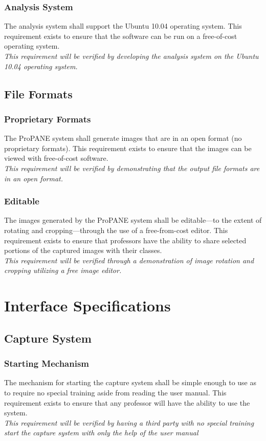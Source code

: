 \documentclass[]{article}
\begin{document}
			\subsubsection{Analysis System}
				The analysis system shall support the Ubuntu 10.04 operating system. This requirement exists to ensure that the software can be run on a free-of-cost operating system. \\
				\emph{This requirement will be verified by developing the analysis system on the Ubuntu 10.04 operating system.}
				
		
		\subsection{File Formats}
			
			\subsubsection{Proprietary Formats}
				The ProPANE system shall generate images that are in an open format (no proprietary formats). This requirement exists to ensure that the images can be viewed with free-of-cost software. \\
				\emph{This requirement will be verified by demonstrating that the output file formats are in an open format.}
				
			\subsubsection{Editable}
				The images generated by the ProPANE system shall be editable---to the extent of rotating and cropping---through the use of a free-from-cost editor. This requirement exists to ensure that professors have the ability to share selected portions of the captured images with their classes.\\
				\emph{This requirement will be verified through a demonstration of image rotation and cropping utilizing a free image editor.}
			
	
	\section{Interface Specifications}
		
		\subsection{Capture System}
			
			\subsubsection{Starting Mechanism}
				The mechanism for starting the capture system shall be simple enough to use as to require no special training aside from reading the user manual. This requirement exists to ensure that any professor will have the ability to use the system.\\
				\emph{This requirement will be verified by having a third party with no special training start the capture system with only the help of the user manual}
				
\end{document}

